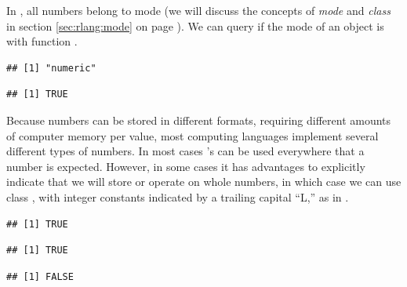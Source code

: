 \documentclass[krantz2]{krantz}\usepackage{knitr}
\begin{document}
\begin{explainbox}
In \Rlang, all numbers belong to mode  (we will discuss the concepts of \emph{mode} and \emph{class} in section \ref{sec:rlang:mode} on page \pageref{sec:rlang:mode}). We can query if the mode of an object is  with function .

\begin{knitrout}\footnotesize
{}\color{fgcolor}\begin{kframe}
\begin{alltt}
\hlstd{(}\hlstd{)}
\end{alltt}
\begin{verbatim}
## [1] "numeric"
\end{verbatim}
\begin{alltt}
 \hlkwb{<-} 
\end{alltt}
\begin{verbatim}
## [1] TRUE
\end{verbatim}
\end{kframe}
\end{knitrout}

Because numbers can be stored in different formats, requiring different amounts of computer memory per value, most computing languages implement several different types of numbers. In most cases \Rpgrm's  can be used everywhere that a number is expected. However, in some cases it has advantages to explicitly indicate that we will store or operate on whole numbers, in which case we can use class , with integer constants indicated by a trailing capital ``L,'' as in  .

\begin{knitrout}\footnotesize
{}\color{fgcolor}\begin{kframe}
\begin{alltt}
\hlstd{(}\hlstd{)}
\end{alltt}
\begin{verbatim}
## [1] TRUE
\end{verbatim}
\begin{alltt}
\hlstd{(}\hlstd{)}
\end{alltt}
\begin{verbatim}
## [1] TRUE
\end{verbatim}
\begin{alltt}
\hlstd{(}\hlstd{)}
\end{alltt}
\begin{verbatim}
## [1] FALSE
\end{verbatim}
\end{kframe}
\end{knitrout}


\end{explainbox}
\end{document}

